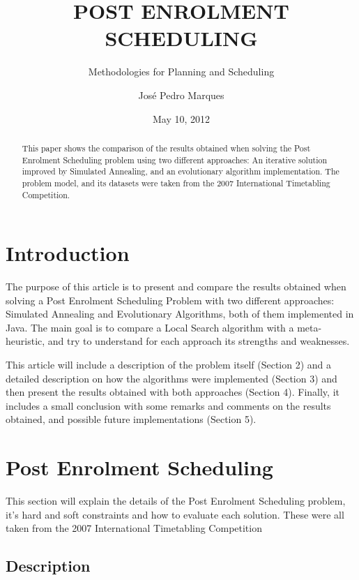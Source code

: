 \documentclass{llncs}
\begin{document}
\title{POST ENROLMENT SCHEDULING}
\subtitle{Methodologies for Planning and Scheduling}
\author{Jos\'e Pedro Marques}
\date{May 10, 2012}
\maketitle

\begin{abstract}

This paper shows the comparison of the results obtained when solving the Post Enrolment Scheduling problem using two different approaches: An iterative solution improved by Simulated Annealing, and an evolutionary algorithm implementation. The problem model, and its datasets were taken from the 2007 International Timetabling Competition. 
\end{abstract}

\section{Introduction}

The purpose of this article is to present and compare the results obtained when solving a Post Enrolment Scheduling Problem with two different approaches: Simulated Annealing and Evolutionary Algorithms, both of them implemented in Java. The main goal is to compare a Local Search algorithm with a meta-heuristic, and try to understand for each approach its strengths and weaknesses. 

This article will include a description of the problem itself (Section 2) and a detailed description on how the algorithms were implemented (Section 3) and then present the results obtained with both approaches (Section 4). Finally, it includes a small conclusion with some remarks and comments on the results obtained, and possible future implementations (Section 5).


\section{Post Enrolment Scheduling}

This section will explain the details of the Post Enrolment Scheduling problem, it's hard and soft constraints and how to evaluate each solution. These were all taken from the 2007 International Timetabling Competition \cite{itc:2007}

\subsection{Description}
\end{document}
